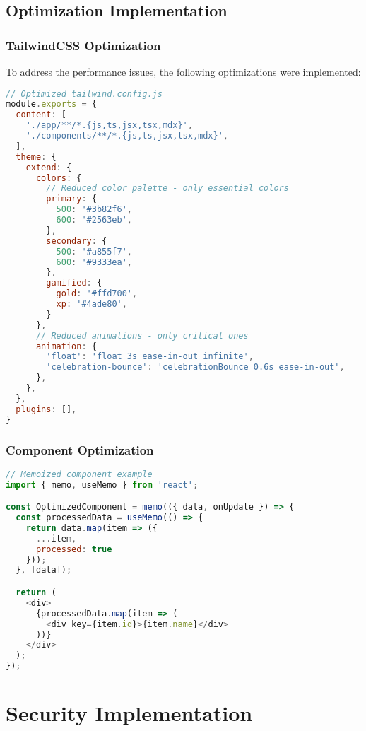 \documentclass[12pt,a4paper]{article}
\begin{document}
\subsection{Optimization Implementation}

\subsubsection{TailwindCSS Optimization}

To address the performance issues, the following optimizations were implemented:

\begin{lstlisting}[language=JavaScript, caption=Optimized TailwindCSS Configuration]
// Optimized tailwind.config.js
module.exports = {
  content: [
    './app/**/*.{js,ts,jsx,tsx,mdx}',
    './components/**/*.{js,ts,jsx,tsx,mdx}',
  ],
  theme: {
    extend: {
      colors: {
        // Reduced color palette - only essential colors
        primary: {
          500: '#3b82f6',
          600: '#2563eb',
        },
        secondary: {
          500: '#a855f7',
          600: '#9333ea',
        },
        gamified: {
          gold: '#ffd700',
          xp: '#4ade80',
        }
      },
      // Reduced animations - only critical ones
      animation: {
        'float': 'float 3s ease-in-out infinite',
        'celebration-bounce': 'celebrationBounce 0.6s ease-in-out',
      },
    },
  },
  plugins: [],
}
\end{lstlisting}

\subsubsection{Component Optimization}

\begin{lstlisting}[language=JavaScript, caption=React Component Optimization]
// Memoized component example
import { memo, useMemo } from 'react';

const OptimizedComponent = memo(({ data, onUpdate }) => {
  const processedData = useMemo(() => {
    return data.map(item => ({
      ...item,
      processed: true
    }));
  }, [data]);

  return (
    <div>
      {processedData.map(item => (
        <div key={item.id}>{item.name}</div>
      ))}
    </div>
  );
});
\end{lstlisting}

\section{Security Implementation}
\end{document}
